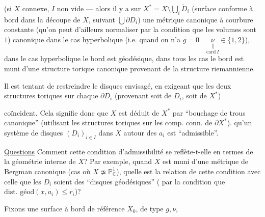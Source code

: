  (si   $X$ connexe, $I$ non vide --- alors  il y a sur $X^*=X\setminus\bigcup_i\mathring D_i$ (surface conforme à bord  dans la découpe de $X$, suivant $\bigcup\partial D_i$) une  métrique  canonique à courbure constante (qu'on peut d'ailleurs normaliser par la condition que les volumes sont $1$)   canonique  dans le cas hyperbolique (i.e. quand on n'a  $g=0\quad\underset{\mathrm{card}\,I}{\underset{\scriptscriptstyle\parallel}{\nu}}\in\{1,2\}$), dans le cas hyperbolique le bord est géodésique,
dans tous les cas le bord est muni d'une structure torique canonique provenant de la structure riemannienne.

Il est tentant de restreindre le disques envisagé, en exigeant que les deux structures toriques sur  chaque $\partial D_i$ (provenant soit de $D_i$, soit de $X^*$)


coïncident. Cela signifie donc que $X$ est déduit de $X^*$ par ``bouchage de trous  canonique'' (utilisant les structures toriques sur les comp. conn. de $\partial X^*$).   qu'un système de disques $(D_i)_{i\in I}$ dans $X$  autour des $a_i$ est ``admissible''.

\uline{Questions} Comment cette condition d'admissibilité se reflète-t-elle en termes de la géométrie interne de $X$? Par exemple,  quand $X$ est muni d'une métrique de Bergman canonique (cas où $X\not\simeq\mathbb P^1_{\mathbb C}$), quelle est la relation de cette condition avec celle que les \deleted{$\partial$}$D_i$ soient des ``disques géodésiques'' ( par la condition que $\text{dist. géod}(x,a_i)\leq r_i$)?

Fixons une  surface   à bord de référence \deleted{\unsure{(}} $X_0$, de type $g,\nu$,

